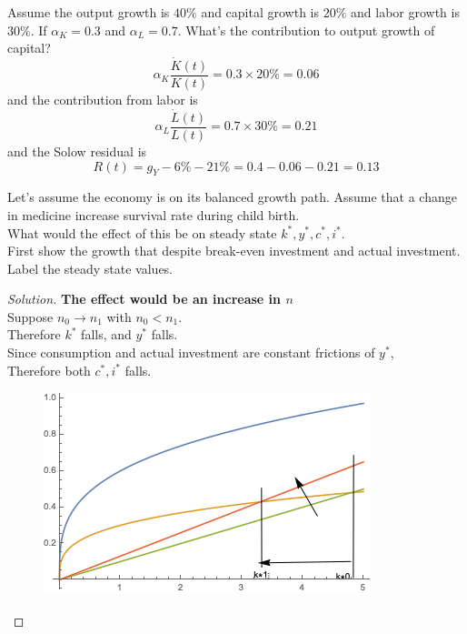 \documentclass[]{article}
\begin{document}
	    \begin{example}
	    	Assume the output growth is $40\%$ and capital growth is $20\%$ and labor growth is $30\%$. If $\alpha_K = 0.3$ and $\alpha_L = 0.7$. What's the contribution to output growth of capital?
	    	\[
	    		\alpha_K \frac{\dot{K}(t)}{K(t)} = 0.3 \times 20\% = 0.06
	    	\]
	    	and the contribution from labor is
	    	\[
	    		\alpha_L \frac{\dot{L}(t)}{L(t)} = 0.7 \times 30\% = 0.21
	    	\]
	    	and the Solow residual is 
	    	\[
	    		R(t) = g_Y - 6\% - 21\% = 0.4 - 0.06 - 0.21 = 0.13
	    	\]
	    \end{example}
	    
	    \begin{example}
	    	Let's assume the economy is on its balanced growth path. Assume that a change in medicine increase survival rate during child birth. \\
	    	What would the effect of this be on steady state $k^*, y^*, c^*, i^*$.\\
	    	First show the growth that despite break-even investment and actual investment. Label the steady state values. \\
	    \end{example}
	    
	    \begin{proof}[Solution]
	    	\textbf{The effect would be an increase in $n$} \\
	    	Suppose $n_0 \to n_1$ with $n_0 < n_1$. \\
	    	Therefore $k^*$ falls, and $y^*$ falls. \\
	    	Since consumption and actual investment are constant frictions of $y^*$, \\
	    	Therefore both $c^*, i^*$ falls.
	    	\begin{figure}[h]
	    		\centering
	    		\includegraphics[width=0.7\linewidth]{figures/4_1}
	    	\end{figure}
	    \end{proof}
	
\end{document}
